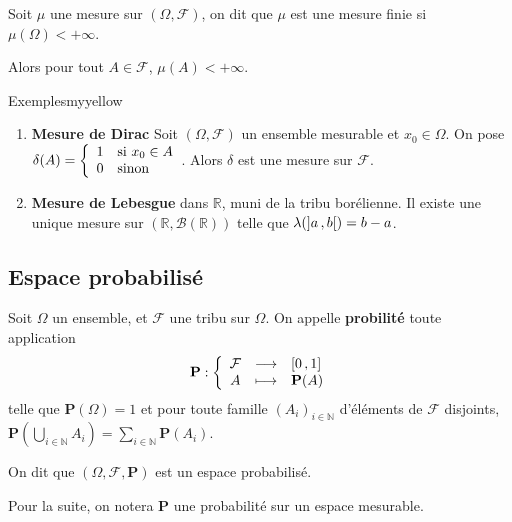     \begin{defi}{}{}
        Soit $\mu$ une mesure sur $(\Omega, \mathcal{F})$, on dit que $\mu$ est une mesure finie si $\mu(\Omega) < +\infty$. 
    \end{defi}

    Alors pour tout $A \in \mathcal{F}$, $\mu(A) < +\infty$.

    \begin{omed}{Exemples}{myyellow}
        \begin{enumerate}
            \item \textbf{Mesure de Dirac} Soit $(\Omega, \mathcal{F})$ un ensemble mesurable et $x_0 \in \Omega$. On pose $\delta(A) = \sisinon{1}{x_0 \in A}{0}$. Alors $\delta$ est une mesure sur $\mathcal{F}$.
            \item \textbf{Mesure de Lebesgue} dans $\mathbb{R}$, muni de la tribu borélienne. Il existe une unique mesure sur $(\mathbb{R}, \mathcal{B}(\mathbb{R}))$ telle que $\lambda(\left] a \, , b \right[) = b-a$.
        \end{enumerate}
    \end{omed}

    \subsection{Espace probabilisé}

    \begin{defi}{}{}
        Soit $\Omega$ un ensemble, et $\mathcal{F}$ une tribu sur $\Omega$. On appelle \textbf{probilité} toute application 
        \[ \fonction{\mathbf{P}}{\mathcal{F}}{\intervalleFF{0}{1}}{A}{\mathbf{P}(A)} \]   
        telle que $\mathbf{P}(\Omega) = 1$ et pour toute famille $(A_i)_{i \in \mathbb{N}}$ d’éléments de $\mathcal{F}$ disjoints, $\mathbf{P}(\bigcup_{i \in \mathbb{N}} A_i) = \sum_{i \in \mathbb{N}} \mathbf{P}(A_i)$. 

        On dit que $(\Omega, \mathcal{F}, \mathbf{P})$ est un espace probabilisé. 
    \end{defi}

    Pour la suite, on notera $\mathbf{P}$ une probabilité sur un espace mesurable.

